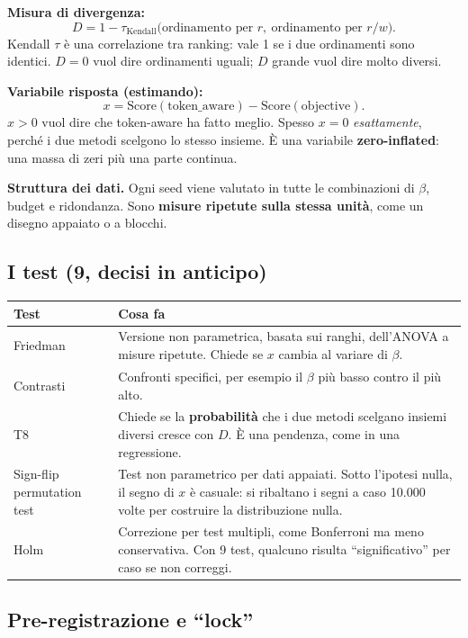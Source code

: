 \documentclass[11pt,a4paper]{article}
\begin{document}
\textbf{Misura di divergenza:}
\[
D = 1 - \tau_{\text{Kendall}}\big(\text{ordinamento per } r,\ \text{ordinamento per } r/w\big).
\]
Kendall $\tau$ è una correlazione tra ranking: vale 1 se i due ordinamenti sono identici. $D=0$ vuol dire ordinamenti uguali; $D$ grande vuol dire molto diversi.

\textbf{Variabile risposta (estimando):}
\[
x = \mathrm{Score}(\text{token\_aware}) - \mathrm{Score}(\text{objective}).
\]
$x>0$ vuol dire che token-aware ha fatto meglio. Spesso $x = 0$ \emph{esattamente}, perché i due metodi scelgono lo stesso insieme. È una variabile \textbf{zero-inflated}: una massa di zeri più una parte continua.

\textbf{Struttura dei dati.} Ogni seed viene valutato in tutte le combinazioni di $\beta$, budget e ridondanza. Sono \textbf{misure ripetute sulla stessa unità}, come un disegno appaiato o a blocchi.

\subsection{I test (9, decisi in anticipo)}

\begin{center}
\begin{tabularx}{\textwidth}{>{\raggedright\arraybackslash}p{3.6cm} X}
\toprule
\textbf{Test} & \textbf{Cosa fa} \\
\midrule
Friedman & Versione non parametrica, basata sui ranghi, dell'ANOVA a misure ripetute. Chiede se $x$ cambia al variare di $\beta$. \\
Contrasti & Confronti specifici, per esempio il $\beta$ più basso contro il più alto. \\
T8 & Chiede se la \textbf{probabilità} che i due metodi scelgano insiemi diversi cresce con $D$. È una pendenza, come in una regressione. \\
Sign-flip permutation test & Test non parametrico per dati appaiati. Sotto l'ipotesi nulla, il segno di $x$ è casuale: si ribaltano i segni a caso 10.000 volte per costruire la distribuzione nulla. \\
Holm & Correzione per test multipli, come Bonferroni ma meno conservativa. Con 9 test, qualcuno risulta ``significativo'' per caso se non correggi. \\
\bottomrule
\end{tabularx}
\end{center}

\subsection{Pre-registrazione e ``lock''}
\end{document}
